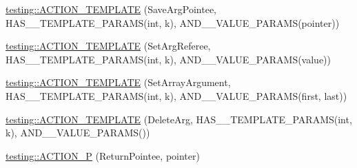 \begin{DoxyCompactItemize}
\item 
\mbox{\hyperlink{namespacetesting_a31565a90ad7f08c1a88e4b138957172c}{testing\+::\+A\+C\+T\+I\+O\+N\+\_\+\+T\+E\+M\+P\+L\+A\+TE}} (Save\+Arg\+Pointee, H\+A\+S\+\_\+\_\+\+T\+E\+M\+P\+L\+A\+T\+E\+\_\+\+P\+A\+R\+A\+MS(int, k), A\+N\+D\+\_\+\_\+\+V\+A\+L\+U\+E\+\_\+\+P\+A\+R\+A\+MS(pointer))
\item 
\mbox{\hyperlink{namespacetesting_adfd3c9538285d257370f955aa81488f1}{testing\+::\+A\+C\+T\+I\+O\+N\+\_\+\+T\+E\+M\+P\+L\+A\+TE}} (Set\+Arg\+Referee, H\+A\+S\+\_\+\_\+\+T\+E\+M\+P\+L\+A\+T\+E\+\_\+\+P\+A\+R\+A\+MS(int, k), A\+N\+D\+\_\+\_\+\+V\+A\+L\+U\+E\+\_\+\+P\+A\+R\+A\+MS(value))
\item 
\mbox{\hyperlink{namespacetesting_a2b0f090219db3bb0630d5ce6f7d911d8}{testing\+::\+A\+C\+T\+I\+O\+N\+\_\+\+T\+E\+M\+P\+L\+A\+TE}} (Set\+Array\+Argument, H\+A\+S\+\_\+\_\+\+T\+E\+M\+P\+L\+A\+T\+E\+\_\+\+P\+A\+R\+A\+MS(int, k), A\+N\+D\+\_\+\_\+\+V\+A\+L\+U\+E\+\_\+\+P\+A\+R\+A\+MS(first, last))
\item 
\mbox{\hyperlink{namespacetesting_a37a5ebfe68fd8dedf8bd82a5ebddcb7b}{testing\+::\+A\+C\+T\+I\+O\+N\+\_\+\+T\+E\+M\+P\+L\+A\+TE}} (Delete\+Arg, H\+A\+S\+\_\+\_\+\+T\+E\+M\+P\+L\+A\+T\+E\+\_\+\+P\+A\+R\+A\+MS(int, k), A\+N\+D\+\_\+\_\+\+V\+A\+L\+U\+E\+\_\+\+P\+A\+R\+A\+MS())
\item 
\mbox{\hyperlink{namespacetesting_a3d58f0d746946064154cd257d368599d}{testing\+::\+A\+C\+T\+I\+O\+N\+\_\+P}} (Return\+Pointee, pointer)
\end{DoxyCompactItemize}
